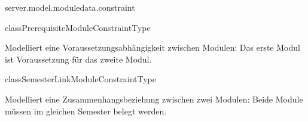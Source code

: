 \begin{texdocpackage}{server.model.moduledata.constraint}
\begin{texdocclass}{class}{PrerequisiteModuleConstraintType}
\label{texdoclet:edu.kit.informatik.studyplan.server.model.moduledata.constraint.PrerequisiteModuleConstraintType}
\begin{texdocclassintro}
Modelliert eine Voraussetzungsabhängigkeit zwischen Modulen:\texdocbr{}
 Das erste Modul ist Voraussetzung für das zweite Modul.\end{texdocclassintro}
\begin{texdocclassconstructors}
\end{texdocclassconstructors}
\begin{texdocclassmethods}
\end{texdocclassmethods}
\end{texdocclass}


\begin{texdocclass}{class}{SemesterLinkModuleConstraintType}
\label{texdoclet:edu.kit.informatik.studyplan.server.model.moduledata.constraint.SemesterLinkModuleConstraintType}
\begin{texdocclassintro}
Modelliert eine Zusammenhangsbeziehung zwischen zwei Modulen:\texdocbr{}
 Beide Module müssen im gleichen Semester belegt werden.\end{texdocclassintro}
\begin{texdocclassconstructors}
\end{texdocclassconstructors}
\begin{texdocclassmethods}
\end{texdocclassmethods}
\end{texdocclass}


\end{texdocpackage}



